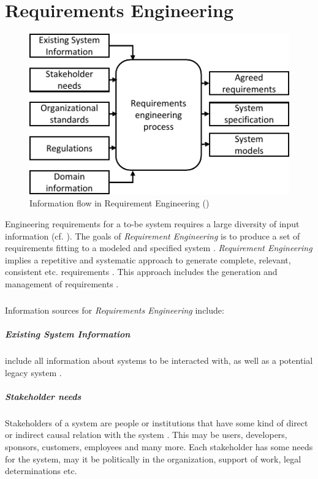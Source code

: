 \chapter{Requirements Engineering\label{chp:reqEng}}
\begin{figure}[H]
    \centering
    \includegraphics[scale=1.3]{img/RequirementInformationStream.pdf}
    \caption[Information flow in Requirements Engineering]{Information flow in Requirement Engineering (\protect\cite[28]{Kotonya.2000})}
    \label{fig:reqFlow}
\end{figure}
Engineering requirements for a to-be system requires a large diversity of input information (cf. ). The goals of \textit{Requirement Engineering} is to produce a set of requirements fitting to a modeled and specified system \parencite[cf.][262]{Pohl.2007}. \textit{Requirement Engineering} implies a repetitive and systematic approach to generate complete, relevant, consistent etc. requirements \parencite[5]{Sommerville.2000}. This approach includes the generation and management of requirements \parencite[262]{Pohl.2007}.
\paragraph*{}
Information sources for \textit{Requirements Engineering} include:
\paragraph*{Existing System Information} include all information about systems to be interacted with, as well as a potential legacy system \parencite[cf.][28]{Kotonya.2000}.
\paragraph*{Stakeholder needs} Stakeholders of a system are people or institutions that have some kind of direct or indirect causal relation with the system \parencite[cf.][8]{Sommerville.2000}. This may be users, developers, sponsors, customers, employees and many more. Each stakeholder has some needs for the system, may it be politically in the organization, support of work, legal determinations etc. \parencites[cf.][28]{Kotonya.2000}[cf.][350-351]{Lauesen.2008}
